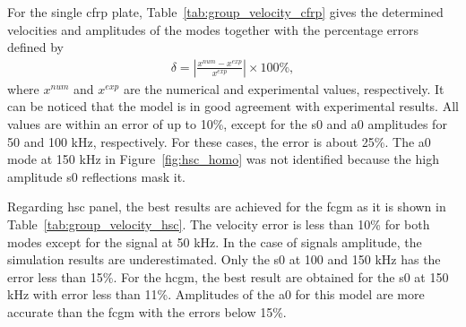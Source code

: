 \documentclass[11pt,a4paper,final]{report}
\theoremstyle{plain}
\begin{document}
For the single \ac{cfrp} plate, Table~\ref{tab:group_velocity_cfrp} gives the determined velocities and amplitudes of the modes together with the percentage errors defined by
\begin{eqnarray}
	\delta = \left|\frac{x^{num}-x^{exp}}{x^{exp}}\right|\times100\%,
	\label{eq:perc_err}
\end{eqnarray}
where \(x^{num}\) and \(x^{exp}\) are the numerical and experimental values, respectively.
It can be noticed that the model is in good agreement with experimental results.
All values are within an error of up to 10\%, except for the \ac{s0} and \ac{a0} amplitudes for 50 and 100 \unit{\kHz}, respectively.
For these cases, the error is about 25\%.
The \ac{a0} mode at 150 \unit{\kHz} in Figure~\ref{fig:hsc_homo} was not identified because the high amplitude \ac{s0} reflections mask it.

Regarding \ac{hsc} panel, the best results are achieved for the \ac{fcgm} as it is shown in Table~\ref{tab:group_velocity_hsc}.
The velocity error is less than 10\% for both modes except for the signal at 50 \unit{\kHz}. 
In the case of signals amplitude, the simulation results are underestimated.
Only the \ac{s0} at 100 and 150 \unit{\kHz} has the error less than 15\%.
For the \ac{hcgm}, the best result are obtained for the \ac{s0} at 150 \unit{\kHz} with error less than 11\%.
Amplitudes of the \ac{a0} for this model are more accurate than the \ac{fcgm} with the errors below 15\%.
\end{document}
